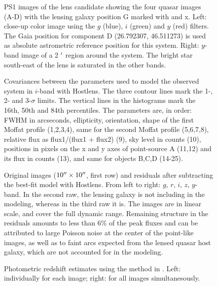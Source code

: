 \documentclass[manuscript]{aastex}
\begin{document}
\begin{figure}
\caption{
PS1 images of the lens candidate showing the four quasar images (A-D) with the lensing galaxy position G marked with and x. Left: close-up color image using the $g$ (blue), $i$ (green) and $y$ (red) filters. The Gaia position for component D (26.792307, 46.511273) is used as absolute astrometric reference position for this system. Right: $y$-band image of a 2 $\mbox{$^\prime$}$ region around the system. The bright star south-east of the lens is saturated in the other bands.}
\label{lens}
\end{figure}


\begin{figure}
\caption{
Covariances between the parameters used to model the observed system in $i$-band with Hostlens. The three contour lines mark the 1-, 2- and 3-$\sigma$ limits. The vertical lines in the histograms mark the 16th, 50th and 84th percentiles. The parameters are, in order: FWHM in arcseconds, ellipticity, orientation, shape of the first Moffat profile (1,2,3,4), same for the second Moffat profile (5,6,7,8), relative flux as flux1/(flux1 + flux2) (9), sky level in counts (10), positions in pixels on the x and y axes of point-source A (11,12) and its flux in counts (13), and same for objects B,C,D (14-25).}
\label{mcmc_hostlens}
\end{figure}


\begin{figure}
\caption{
Original images ($10\mbox{$^{\prime\prime}$}\times10\mbox{$^{\prime\prime}$}$, first row) and residuals after subtracting the best-fit model with Hostlens. From left to right: $g$, $r$, $i$, $z$, $y$-band. In the second raw, the lensing galaxy is not including in the modeling, whereas in the third raw it is. The images are in linear scale, and cover the full dynamic range. Remaining structure in the residuals amounts to less than 6\% of the peak fluxes and can be attributed to large Poisson noise at the center of the point-like images, as well as to faint arcs expected from the lensed quasar host galaxy, which are not accounted for in the modeling.}
\label{hostlens}
\end{figure}


\begin{figure}
\caption{
Photometric redshift estimates using the method in \citet{wu10}. 
Left: individually for each image; right: for all images simultanesously.}
\label{redshift}
\end{figure}
\end{document}
